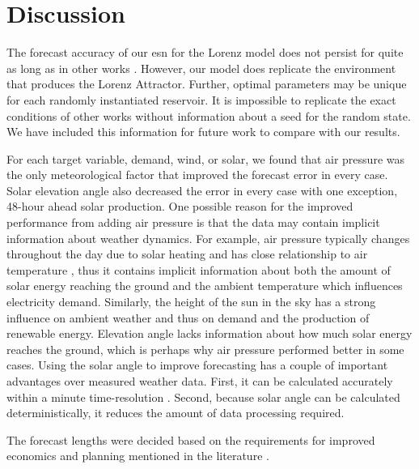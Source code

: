 \section{Discussion}

The forecast accuracy of our \gls{esn} for the Lorenz model does not persist
for quite as long as in other works \cite{pathak_using_2017}. However, our
model does replicate the environment that produces the Lorenz Attractor.
Further, optimal parameters may be unique for each randomly instantiated
reservoir. It is impossible to replicate the exact conditions of other works
without information about a seed for the random state. We have included this information for future work to compare with our results.

For each target variable, demand, wind, or solar, we found that air pressure was
the only meteorological factor that improved the forecast error in every case.
Solar elevation angle also decreased the error in every case with one exception,
48-hour ahead solar production. One possible reason for the improved performance
from adding air pressure is that the data may contain implicit information about
weather dynamics. For example, air pressure typically changes throughout the
day due to solar heating and has close relationship to air temperature
\cite{aguilar_seasonal_2001}, thus
it contains implicit information about both the amount of solar energy reaching
the ground and the ambient temperature which influences electricity demand.
Similarly, the height of the sun in the sky has a strong influence on
ambient weather and thus on  demand and the production of renewable energy.
Elevation angle lacks information about how much solar energy reaches the
ground, which is perhaps why air pressure performed better in some cases.
Using the solar angle to improve forecasting has a couple of important
advantages over measured weather data. First, it can be calculated accurately
within a minute time-resolution \cite{us_department_of_commerce_esrl_nodate}.
Second, because solar angle can be calculated deterministically, it reduces the
amount of data processing required.

The forecast lengths were decided based on the requirements for improved
economics and planning mentioned in the literature
 \cite{wang_quantifying_2016,mc_garrigle_quantifying_2015,brancucci_martinez-anido_value_2016}.

